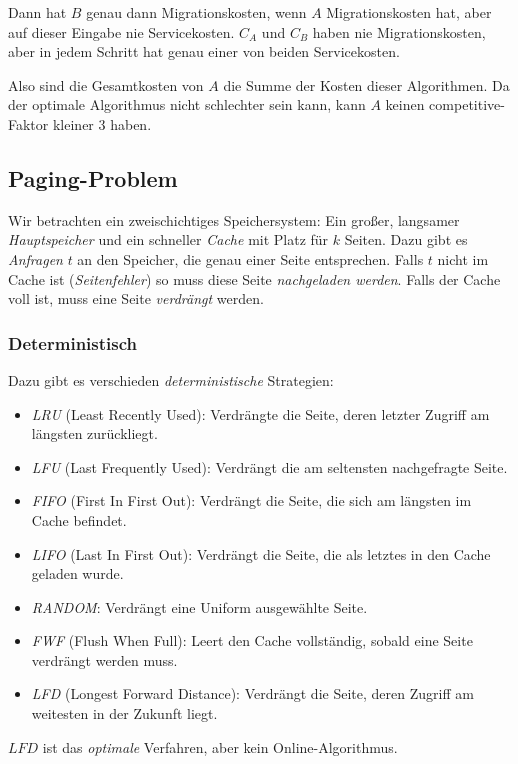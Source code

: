 \documentclass{panikzettel}
\begin{document}
Dann hat $B$ genau dann Migrationskosten, wenn $A$ Migrationskosten hat, aber auf dieser Eingabe nie Servicekosten. $C_A$ und $C_B$ haben nie Migrationskosten, aber in jedem Schritt hat genau einer von beiden Servicekosten.

Also sind die Gesamtkosten von $A$ die Summe der Kosten dieser Algorithmen. Da der optimale Algorithmus nicht schlechter sein kann, kann $A$ keinen competitive-Faktor kleiner $3$ haben.

\subsection{Paging-Problem}
Wir betrachten ein zweischichtiges Speichersystem: Ein großer, langsamer \emph{Hauptspeicher} und ein schneller \emph{Cache} mit Platz für $k$ Seiten. Dazu gibt es \emph{Anfragen} $t$ an den Speicher, die genau einer Seite entsprechen. Falls $t$ nicht im Cache ist (\textit{Seitenfehler}) so muss diese Seite \emph{nachgeladen werden}. Falls der Cache voll ist, muss eine Seite \emph{verdrängt} werden.

\subsubsection{Deterministisch}
Dazu gibt es verschieden \emph{deterministische} Strategien:
\begin{itemize}
    \item \textit{LRU} (Least Recently Used): Verdrängte die Seite, deren letzter Zugriff am längsten zurückliegt.
    \item \textit{LFU} (Last Frequently Used): Verdrängt die am seltensten nachgefragte Seite.
    \item \textit{FIFO} (First In First Out): Verdrängt die Seite, die sich am längsten im Cache befindet.
    \item \textit{LIFO} (Last In First Out): Verdrängt die Seite, die als letztes in den Cache geladen wurde.
    \item \textit{RANDOM}: Verdrängt eine Uniform ausgewählte Seite.
    \item \textit{FWF} (Flush When Full): Leert den Cache vollständig, sobald eine Seite verdrängt werden muss.
    \item \textit{LFD} (Longest Forward Distance): Verdrängt die Seite, deren Zugriff am weitesten in der Zukunft liegt.
\end{itemize}
$\textit{LFD}$ ist das \emph{optimale} Verfahren, aber kein Online-Algorithmus.
\end{document}

